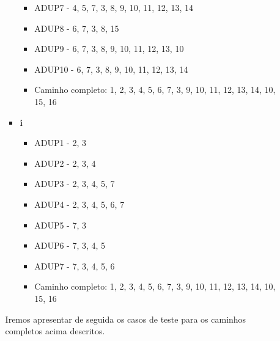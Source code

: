 \documentclass{article}
\begin{document}
\begin{itemize}
\begin{enumerate}
\begin{itemize}
\begin{itemize}
            \item ADUP7 - 4, 5, 7, 3, 8, 9, 10, 11, 12, 13, 14
            \item ADUP8 - 6, 7, 3, 8, 15
            \item ADUP9 - 6, 7, 3, 8, 9, 10, 11, 12, 13, 10
            \item ADUP10 - 6, 7, 3, 8, 9, 10, 11, 12, 13, 14
            \item Caminho completo: 1, 2, 3, 4, 5, 6, 7, 3, 9, 10, 11, 12, 13, 14, 10, 15, 16
        \end{itemize}
        \item \textbf{i}
        \begin{itemize}
            \item ADUP1 - 2, 3
            \item ADUP2 - 2, 3, 4
            \item ADUP3 - 2, 3, 4, 5, 7
            \item ADUP4 - 2, 3, 4, 5, 6, 7
            \item ADUP5 - 7, 3
            \item ADUP6 - 7, 3, 4, 5
            \item ADUP7 - 7, 3, 4, 5, 6
            \item Caminho completo: 1, 2, 3, 4, 5, 6, 7, 3, 9, 10, 11, 12, 13, 14, 10, 15, 16
        \end{itemize}
      
    \end{itemize}

    Iremos apresentar de seguida os casos de teste para os caminhos completos acima descritos.\\


\end{enumerate}
\end{itemize}
\end{document}
